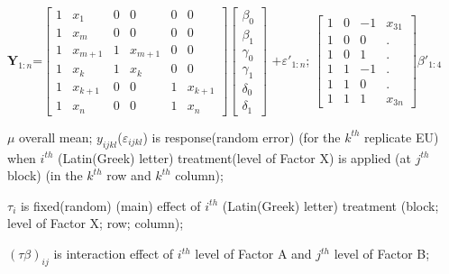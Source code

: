 \documentclass[
  10pt,
  twocolumn]{article}
\begin{document}
\(\mathbf{Y}_{1:n}\)=\(\begin{bmatrix} 1&x_1&0&0&0&0\\1&x_m&0&0&0&0\\1&x_{m+1}&1&x_{m+1}&0&0\\1&x_{k}&1&x_{k}&0&0\\1&x_{k+1}&0&0&1&x_{k+1}\\1&x_{n}&0&0&1&x_{n}\end{bmatrix}\begin{bmatrix} \beta_0 \\ \beta_1 \\ \gamma_0 \\ \gamma_1 \\ \delta_0 \\ \delta_1\end{bmatrix}\)
\(+\varepsilon'_{1:n}\);
\(\begin{bmatrix} 1&0&-1&x_{31}\\1&0&0&. \\1&0&1&. \\1&1&-1&. \\1&1&0&. \\1&1&1&x_{3n}\end{bmatrix} \beta'_{1:4}\)

\pagebreak

\(\mu\) overall mean; \(y_{ijkl}\)(\(\varepsilon_{ijkl}\)) is
response(random error) (for the \(k^{th}\) replicate EU) when \(i^{th}\)
(Latin(Greek) letter) treatment(level of Factor X) is applied (at
\(j^{th}\) block) (in the \(k^{th}\) row and \(k^{th}\) column);

\(\tau_i\) is fixed(random) (main) effect of \(i^{th}\) (Latin(Greek)
letter) treatment (block; level of Factor X; row; column);

\((\tau\beta)_{ij}\) is interaction effect of \(i^{th}\) level of Factor
A and \(j^{th}\) level of Factor B;
\end{document}
